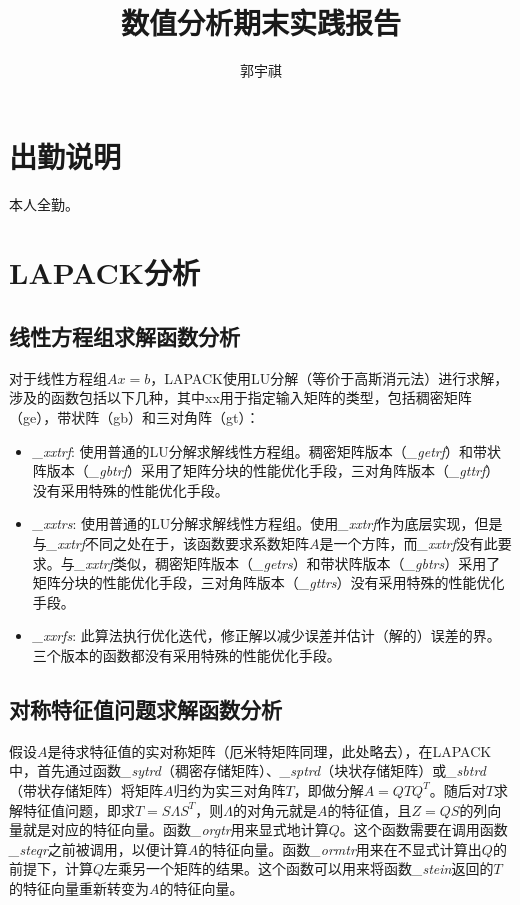 \documentclass[a4paper]{article}
\begin{document}
 
\title{数值分析期末实践报告}
\author{郭宇祺}
\date{}
\maketitle
\normalsize
\section{出勤说明}
本人全勤。

\section{LAPACK分析}
\subsection{线性方程组求解函数分析}
对于线性方程组$Ax=b$，LAPACK使用LU分解（等价于高斯消元法）进行求解，涉及的函数包括以下几种，其中xx用于指定输入矩阵的类型，包括稠密矩阵（ge），带状阵（gb）和三对角阵（gt）：
\begin{itemize}
  \item \emph{\_xxtrf}: 使用普通的LU分解求解线性方程组。稠密矩阵版本（\emph{\_getrf}）和带状阵版本（\emph{\_gbtrf}）采用了矩阵分块的性能优化手段，三对角阵版本（\emph{\_gttrf}）没有采用特殊的性能优化手段。
  \item \emph{\_xxtrs}: 使用普通的LU分解求解线性方程组。使用\emph{\_xxtrf}作为底层实现，但是与\emph{\_xxtrf}不同之处在于，该函数要求系数矩阵$A$是一个方阵，而\emph{\_xxtrf}没有此要求。与\emph{\_xxtrf}类似，稠密矩阵版本（\emph{\_getrs}）和带状阵版本（\emph{\_gbtrs}）采用了矩阵分块的性能优化手段，三对角阵版本（\emph{\_gttrs}）没有采用特殊的性能优化手段。
  \item \emph{\_xxrfs}: 此算法执行优化迭代，修正解以减少误差并估计（解的）误差的界。三个版本的函数都没有采用特殊的性能优化手段。
\end{itemize}

\subsection{对称特征值问题求解函数分析}

假设$A$是待求特征值的实对称矩阵（厄米特矩阵同理，此处略去），在LAPACK中，首先通过函数\emph{\_sytrd}（稠密存储矩阵）、\emph{\_sptrd}（块状存储矩阵）或\emph{\_sbtrd}（带状存储矩阵）将矩阵$A$归约为实三对角阵$T$，即做分解$A=QTQ^T$。随后对$T$求解特征值问题，即求$T=S\Lambda S^T$，则$\Lambda$的对角元就是$A$的特征值，且$Z=QS$的列向量就是对应的特征向量。函数\emph{\_orgtr}用来显式地计算$Q$。这个函数需要在调用函数\emph{\_steqr}之前被调用，以便计算$A$的特征向量。函数\emph{\_ormtr}用来在不显式计算出$Q$的前提下，计算$Q$左乘另一个矩阵的结果。这个函数可以用来将函数\emph{\_stein}返回的$T$的特征向量重新转变为$A$的特征向量。
\end{document}
